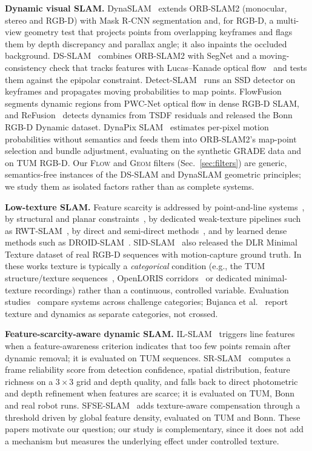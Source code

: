 \documentclass[conference]{IEEEtran}
\newcommand{\flow}{\textsc{Flow}}
\newcommand{\geom}{\textsc{Geom}}
\begin{document}
\textbf{Dynamic visual SLAM.} DynaSLAM~\cite{bescos2018dynaslam} extends ORB-SLAM2 (monocular, stereo and RGB-D) with Mask R-CNN segmentation and, for RGB-D, a multi-view geometry test that projects points from overlapping keyframes and flags them by depth discrepancy and parallax angle; it also inpaints the occluded background. DS-SLAM~\cite{yu2018dsslam} combines ORB-SLAM2 with SegNet and a moving-consistency check that tracks features with Lucas--Kanade optical flow~\cite{lucas1981iterative} and tests them against the epipolar constraint. Detect-SLAM~\cite{zhong2018detect} runs an SSD detector on keyframes and propagates moving probabilities to map points. FlowFusion~\cite{zhang2020flowfusion} segments dynamic regions from PWC-Net optical flow in dense RGB-D SLAM, and ReFusion~\cite{palazzolo2019refusion} detects dynamics from TSDF residuals and released the Bonn RGB-D Dynamic dataset. DynaPix SLAM~\cite{xu2023dynapix} estimates per-pixel motion probabilities without semantics and feeds them into ORB-SLAM2's map-point selection and bundle adjustment, evaluating on the synthetic GRADE data and on TUM RGB-D. Our \flow{} and \geom{} filters (Sec.~\ref{sec:filters}) are generic, semantics-free instances of the DS-SLAM and DynaSLAM geometric principles; we study them as isolated factors rather than as complete systems.

\textbf{Low-texture SLAM.} Feature scarcity is addressed by point-and-line systems~\cite{pumarola2017plslam,gomezojeda2019plslam}, by structural and planar constraints~\cite{li2021structural,yunus2021manhattan}, by dedicated weak-texture pipelines such as RWT-SLAM~\cite{peng2022rwtslam}, by direct and semi-direct methods~\cite{engel2018dso,fontan2023sidslam}, and by learned dense methods such as DROID-SLAM~\cite{teed2021droid}. SID-SLAM~\cite{fontan2023sidslam} also released the DLR Minimal Texture dataset of real RGB-D sequences with motion-capture ground truth. In these works texture is typically a \emph{categorical} condition (e.g., the TUM structure/texture sequences~\cite{sturm2012tum}, OpenLORIS corridors~\cite{shi2020openloris} or dedicated minimal-texture recordings) rather than a continuous, controlled variable. Evaluation studies~\cite{bujanca2021robust,sharafutdinov2021comparison} compare systems across challenge categories; Bujanca et al.~\cite{bujanca2021robust} report texture and dynamics as separate categories, not crossed.

\textbf{Feature-scarcity-aware dynamic SLAM.} IL-SLAM~\cite{zhang2025ilslam} triggers line features when a feature-awareness criterion indicates that too few points remain after dynamic removal; it is evaluated on TUM sequences. SR-SLAM~\cite{zhang2025srslam} computes a frame reliability score from detection confidence, spatial distribution, feature richness on a $3\times3$ grid and depth quality, and falls back to direct photometric and depth refinement when features are scarce; it is evaluated on TUM, Bonn and real robot runs. SFSE-SLAM~\cite{li2026sfse} adds texture-aware compensation through a threshold driven by global feature density, evaluated on TUM and Bonn. These papers motivate our question; our study is complementary, since it does not add a mechanism but measures the underlying effect under controlled texture.
\end{document}
